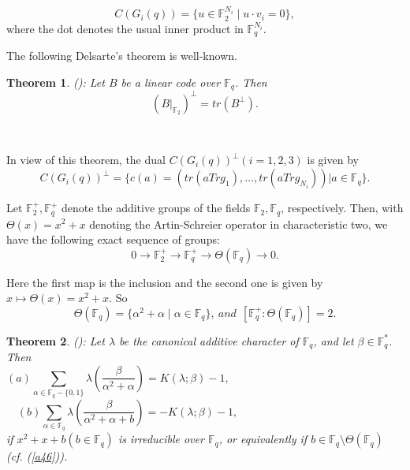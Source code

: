 \documentclass[a4,12pt]{elsart}
\newtheorem{theorem}{Theorem}
\begin{document}
\begin{equation}\label{a44}
C(G_i(q)) = \{ u \in {\mathbb{F}}_2^{N_i} \mid u\cdot v_i = 0 \},
\end{equation}
where the dot denotes the usual inner product in ${\mathbb{F}}_q^{N_i}$.

 The following Delsarte's theorem is well-known.\\

 \begin{theorem}\label{K}(\cite{FN}):  Let $B$  be a linear code over ${\mathbb{F}}_q$.  Then
\[
(B|_{{\mathbb{F}}_2})^\bot = tr(B^\bot).
\]
 \end{theorem}\

 In view of this theorem, the dual $C(G_i(q))^\bot (i=1,2,3)$ is given by
\begin{equation}\label{a45}
C(G_i(q))^\bot = \{ c(a) = (tr(aTrg_1),\ldots,tr(aTrg_{N_i}))| a \in
{\mathbb{F}}_q \}.
\end{equation}

Let  ${\mathbb{F}}_2^+,{\mathbb{F}}_q^+$ denote the additive groups of the fields
${\mathbb{F}}_2,{\mathbb{F}}_q$, respectively. Then, with  $\Theta(x)=x^2+x$ denoting
the Artin-Schreier operator in characteristic two, we have the
following exact sequence of groups:
\begin{equation*}
0 \rightarrow {\mathbb{F}}_2^+ \rightarrow {\mathbb{F}}_q^+ \rightarrow \Theta({\mathbb{F}}_q)
\rightarrow 0.
\end{equation*}

Here the first map is the inclusion and the second one is given by
$x \mapsto \Theta(x) = x^2+x$. So
\begin{equation}\label{a46}
\Theta({\mathbb{F}}_q) = \{\alpha^2 + \alpha \mid  \alpha \in {\mathbb{F}}_q \},~ and
~~[{\mathbb{F}}_q^+ : \Theta({\mathbb{F}}_q)] = 2.
\end{equation}

\begin{theorem}\label{L}(\cite{D3}):
Let $\lambda$  be the canonical additive character of ${\mathbb{F}}_q$, and
let $\beta \in {\mathbb{F}}_q^*$.
Then
\begin{equation*}
 (a) \sum_{\alpha \in
 {\mathbb{F}}_q-\{0,1\}}\lambda(\frac{\beta}{\alpha^2+\alpha})=K(\lambda;\beta)-1,
 \qquad \qquad \qquad \qquad \qquad \qquad \qquad \qquad
\end{equation*}
\begin{equation}\label{a47}
(b)\sum_{\alpha \in
{\mathbb{F}}_q}\lambda(\frac{\beta}{\alpha^2+\alpha+b})=-K(\lambda;\beta)-1,
\qquad \qquad \qquad \qquad \qquad \qquad \qquad
\end{equation}
if $x^2+x+b (b\in {\mathbb{F}}_q)$ is irreducible over ${\mathbb{F}}_q$, or
equivalently if $b \in {\mathbb{F}}_q\setminus\Theta({\mathbb{F}}_q)$ (cf.
\;(\ref{a46})).
\end{theorem}
\end{document}
